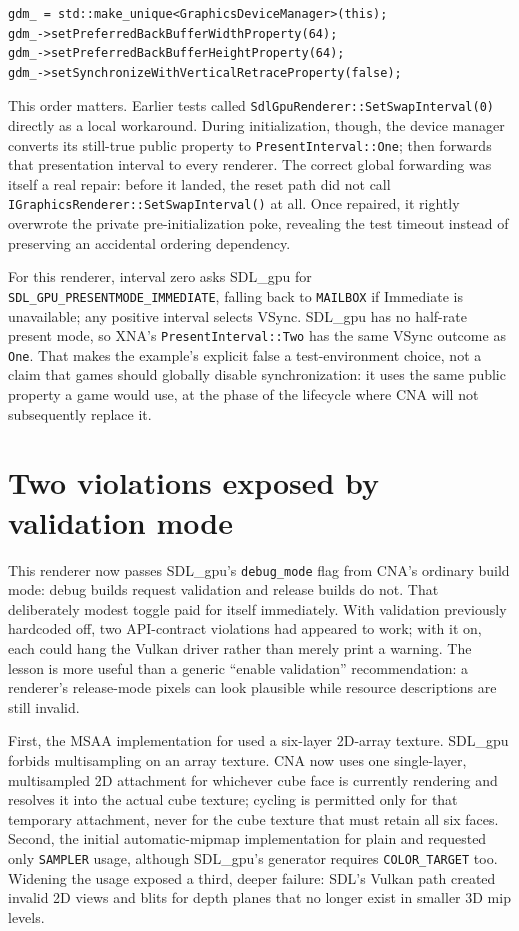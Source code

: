\begin{lstlisting}
gdm_ = std::make_unique<GraphicsDeviceManager>(this);
gdm_->setPreferredBackBufferWidthProperty(64);
gdm_->setPreferredBackBufferHeightProperty(64);
gdm_->setSynchronizeWithVerticalRetraceProperty(false);
\end{lstlisting}

This order matters. Earlier tests called \texttt{SdlGpuRenderer::SetSwapInterval(0)}
directly as a local workaround. During initialization, though, the device manager converts its
still-true public property to \texttt{PresentInterval::One}; 
then forwards that presentation interval to every renderer. The correct global forwarding was
itself a real repair: before it landed, the reset path did not call
\texttt{IGraphicsRenderer::SetSwapInterval()} at all. Once repaired, it rightly overwrote the
private pre-initialization poke, revealing the test timeout instead of preserving an accidental
ordering dependency.

For this renderer, interval zero asks SDL\_gpu for \texttt{SDL\_GPU\_PRESENTMODE\_IMMEDIATE},
falling back to \texttt{MAILBOX} if Immediate is unavailable; any positive interval selects
VSync. SDL\_gpu has no half-rate present mode, so XNA's \texttt{PresentInterval::Two} has the
same VSync outcome as \texttt{One}. That makes the example's explicit false a test-environment
choice, not a claim that games should globally disable synchronization: it uses the same public
property a game would use, at the phase of the lifecycle where CNA will not subsequently replace
it.

\section{Two violations exposed by validation mode}

This renderer now passes SDL\_gpu's \texttt{debug\_mode} flag from CNA's ordinary build mode:
debug builds request validation and release builds do not. That deliberately modest toggle paid
for itself immediately. With validation previously hardcoded off, two API-contract violations
had appeared to work; with it on, each could hang the Vulkan driver rather than merely print a
warning. The lesson is more useful than a generic ``enable validation'' recommendation: a
renderer's release-mode pixels can look plausible while resource descriptions are still invalid.

First, the MSAA implementation for  used a six-layer 2D-array
texture. SDL\_gpu forbids multisampling on an array texture. CNA now uses one single-layer,
multisampled 2D attachment for whichever cube face is currently rendering and resolves it into
the actual cube texture; cycling is permitted only for that temporary attachment, never for the
cube texture that must retain all six faces. Second, the initial automatic-mipmap implementation
for plain  and  requested only \texttt{SAMPLER} usage,
although SDL\_gpu's generator requires \texttt{COLOR\_TARGET} too. Widening the usage exposed a
third, deeper failure: SDL's Vulkan path created invalid 2D views and blits for depth planes that
no longer exist in smaller 3D mip levels.

